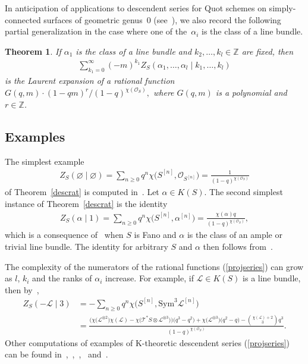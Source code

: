 \documentclass[10pt,a4paper]{amsart}
\newtheorem{Theorem}{Theorem}[section]
\numberwithin{equation}{section}
\newcommand{\Sym}{\mathrm{Sym}}
\def\O{\mathcal{O}}
\def\Z{\mathbb Z}
\begin{document}
In anticipation of applications to descendent series for Quot schemes
on simply-connected surfaces of geometric genus~0 (see~\cite[Section~3.4]{AJLOP}), we also record the following partial generalization in the case where one of the~$\alpha_i$ is the class of a line bundle.

\begin{Theorem}\label{lbdescrat}
If $\alpha_1$ is the class of a line bundle and $k_2,\dots,k_l\in \Z$ are fixed, then
\begin{align}\label{lbspec}
\sum_{k_1=0}^{\infty} (-m)^{k_1} Z_{S}(\alpha_1,\dots,\alpha_l\mid k_1,\dots,k_l)
\end{align}
is the Laurent expansion of a rational function $G(q,m)\cdot (1-qm)^r/(1-q)^{\chi(\mathcal{O}_S)},$ where $G(q,m)$ is a polynomial and $r\in \Z$.
\end{Theorem}

\subsection{Examples}
The simplest example
\begin{gather*}
Z_{S}(\varnothing\mid\varnothing)= \sum_{n\geq 0} q^n \chi\big(S^{[n]},\O_{S^{[n]}}\big)=\frac{1}{(1-q)^{\chi(\mathcal{O}_S)}}
\end{gather*}
 of Theorem~\ref{descrat} is computed in~\cite[Proposition 3.3(b)]{G}.
Let $\alpha\in K(S)$. The second simplest instance of Theorem~\ref{descrat} is the identity
\begin{gather*}
Z_{S}(\alpha\mid 1)=\sum_{n\geq 0} q^n \chi\big(S^{[n]},\alpha^{[n]}\big)=\frac{ \chi(\alpha) q}{(1-q)^{\chi(\mathcal{O}_S)}},
\end{gather*}
which is a consequence of~\cite[Corollary~1.3]{D} when $S$ is Fano and $\alpha$ is the class of an ample or trivial line bundle. The identity for arbitrary $S$ and $\alpha$ then follows from~\cite[Theorem~4.2]{EGL}.

The complexity of the numerators of the rational functions (\ref{projseries}) can grow as $l$, $k_i$ and the ranks of $\alpha_i$ increase. For example, if $\mathcal{L}\in K(S)$ is a line bundle, then by~\cite[Theorem~5.25]{Sc2},
\begin{align*}
Z_S(-\mathcal{L}\mid 3)&=-\sum_{n\geq 0} q^{n}\chi\big(S^{[n]},\Sym^3 \mathcal{L}^{[n]}\big)
\\
&= \frac{\big(\chi\big(\mathcal{L}^{\otimes 2}\big)\chi(\mathcal{L})-\chi\big(\mathcal{T}^*S\otimes \mathcal{L}^{\otimes 3}\big) \big)\big(q^3-q^2\big)+\chi\big(\mathcal{L}^{\otimes 3}\big) \big(q^2-q\big)-\binom{\chi(\mathcal{L})+2}{3} q^3}{(1-q)^{\chi(\mathcal{O}_S)}}.
\end{align*}
Other computations of examples of K-theoretic descendent series (\ref{projseries}) can be found in~\cite[Section~6]{A},~\cite[Corollary~8.11]{K},~\cite[Section~5]{Sc1},~\cite[Theorem~5.25]{Sc2} and~\cite[Section~7]{Z}.
\end{document}
